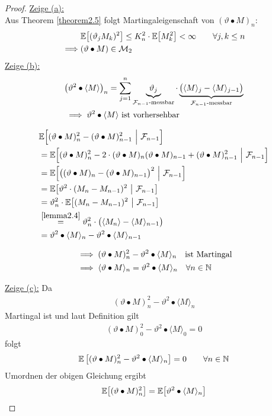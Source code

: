 \begin{proof}
\underline{Zeige (a):}\\
Aus Theorem \ref{theorem2.5} folgt Martingaleigenschaft von $(\vartheta\bullet M)_n$:
\begin{align*}
	&\mathbb{E}\big[(\vartheta_j M_k)^2\big]\leq K_n^2\cdot\mathbb{E}\big[M_k^2\big]<\infty\qquad\forall j,k\leq n\\
	\implies&(\vartheta\bullet M)\in \mathcal{M}_2
\end{align*}
\underline{Zeige (b):}
\begin{align*}
&\big(\vartheta^2\bullet\langle M\rangle\big)_n
=\sum\limits_{j=1}^n\underbrace{\vartheta_j}_{\mathcal{F}_{n-1}\text{-messbar}}\cdot\underbrace{\big(\langle M\rangle_j-\langle M\rangle_{j-1}\big)}_{\mathcal{F}_{n-1}\text{-messbar}}\\
&\implies\vartheta^2\bullet\langle M\rangle\text{ ist vorhersehbar}
\end{align*}

\begin{align*}
	&\mathbb{E}\Big[(\vartheta\bullet M)^2_n-(\vartheta\bullet M)^2_{n-1}~\Big|~\mathcal{F}_{n-1}\Big] \\
	&=\mathbb{E}\Big[(\vartheta\bullet M)^2_n-2\cdot(\vartheta\bullet M)_n(\vartheta\bullet M)_{n-1} +(\vartheta\bullet M)^2_{n-1}~\Big|~\mathcal{F}_{n-1}\Big]\\
&=\mathbb{E}\Big[\big((\vartheta\bullet M)_n-(\vartheta\bullet M)_{n-1}\big)^2~\Big|~\mathcal{F}_{n-1}\Big]\\
&=\mathbb{E}\big[\vartheta^2\cdot(M_n-M_{n-1})^2~\big|~\mathcal{F}_{n-1}\big]\\
&=\vartheta^2_n\cdot\mathbb{E}\big[(M_n-M_{n-1})^2~\big|~\mathcal{F}_{n-1}\big]\\
&\stackrel{\ref{lemma2.4}}{=}
\vartheta_n^2\cdot\big(\langle M_n\rangle-\langle M\rangle_{n-1}\big) \\
&= \vartheta^2\bullet\langle M\rangle_n - \vartheta^2\bullet\langle M\rangle_{n-1}
\end{align*}

\begin{align*}
	&\implies (\vartheta\bullet M)^2_n - \vartheta^2\bullet\langle M\rangle_n \quad \text{ist Martingal} \\
	&\implies \langle \vartheta \bullet M \rangle_n = \vartheta^2 \bullet \langle M \rangle_n \quad \forall n\in\mathbb{N}
\end{align*}

\underline{Zeige (c):}
Da
\begin{align*}
	(\vartheta \bullet M)^2_n - \vartheta^2 \bullet \langle M \rangle_n
\end{align*}
Martingal ist und laut Definition gilt
\begin{align*}
	(\vartheta \bullet M)^2_0 - \vartheta^2 \bullet \langle M \rangle_0 = 0
\end{align*} folgt
\begin{align*}
	\mathbb{E}\left[(\vartheta \bullet M)^2_n - \vartheta^2 \bullet \langle M \rangle_n\right] = 0 \qquad \forall n\in\mathbb{N}
\end{align*}
Umordnen der obigen Gleichung ergibt
\begin{align*}
\mathbb{E}\big[(\vartheta\bullet M)^2_n\big]=\mathbb{E}\big[\vartheta^2\bullet\langle M\rangle_n\big]
\end{align*}
\end{proof}
